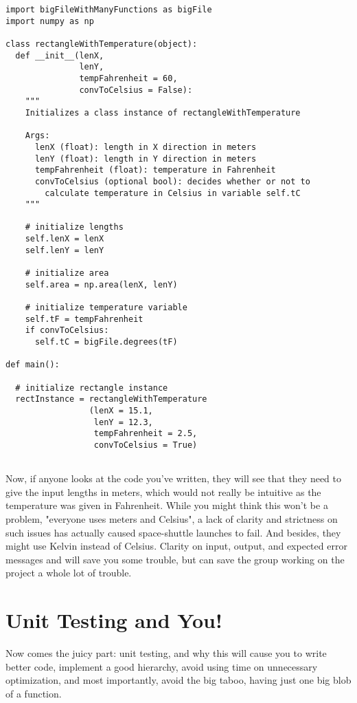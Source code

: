 \documentclass[10pt,a4paper]{article}
\begin{document}
\begin{lstlisting}
import bigFileWithManyFunctions as bigFile
import numpy as np

class rectangleWithTemperature(object):
  def __init__(lenX, 
               lenY, 
               tempFahrenheit = 60, 
               convToCelsius = False):
    """
    Initializes a class instance of rectangleWithTemperature
    
    Args: 
      lenX (float): length in X direction in meters
      lenY (float): length in Y direction in meters
      tempFahrenheit (float): temperature in Fahrenheit
      convToCelsius (optional bool): decides whether or not to 
        calculate temperature in Celsius in variable self.tC
    """
    
    # initialize lengths
    self.lenX = lenX
    self.lenY = lenY
    
    # initialize area
    self.area = np.area(lenX, lenY)
	
    # initialize temperature variable
    self.tF = tempFahrenheit
    if convToCelsius:
      self.tC = bigFile.degrees(tF)

def main():

  # initialize rectangle instance
  rectInstance = rectangleWithTemperature
                 (lenX = 15.1, 
                  lenY = 12.3, 
                  tempFahrenheit = 2.5, 
                  convToCelsius = True)
	
\end{lstlisting}

Now, if anyone looks at the code you've written, they will see that they need to give the input lengths in meters, which would not really be intuitive as the temperature was given in Fahrenheit. While you might think this won't be a problem, "everyone uses meters and Celsius", a lack of clarity and strictness on such issues has actually caused space-shuttle launches to fail. And besides, they might use Kelvin instead of Celsius. Clarity on input, output, and expected error messages and will save you some trouble, but can save the group working on the project a whole lot of trouble.   

\section{Unit Testing and You!}
Now comes the juicy part: unit testing, and why this will cause you to write better code, implement a good hierarchy, avoid using time on unnecessary optimization, and most importantly, avoid the big taboo, having just one big blob of a function.
\end{document}
